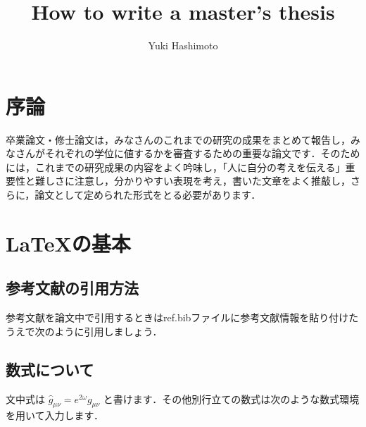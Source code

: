 \documentclass[12pt]{kupaper}
\begin{document}

\title{How to write a master's thesis}
\author{Yuki Hashimoto}


\Maketitle

\setcounter{page}{1}
\tableofcontents

\chapter{序論}

卒業論文・修士論文は，みなさんのこれまでの研究の成果をまとめて報告し，みなさんがそれぞれの学位に値するかを審査するための重要な論文です．そのためには，これまでの研究成果の内容をよく吟味し，「人に自分の考えを伝える」重要性と難しさに注意し，分かりやすい表現を考え，書いた文章をよく推敲し，さらに，論文として定められた形式をとる必要があります．

\chapter{\LaTeX の基本}
\section{参考文献の引用方法}
参考文献を論文中で引用するときはref.bibファイルに参考文献情報を貼り付けたうえで次のように引用しましょう\cite{G_ng_r_2021}．
\section{数式について}
文中式は $\hat{g}_{\mu\nu}=e^{2\omega}g_{\mu\nu}$ と書けます．その他別行立ての数式は次のような数式環境を用いて入力します．
\end{document}
